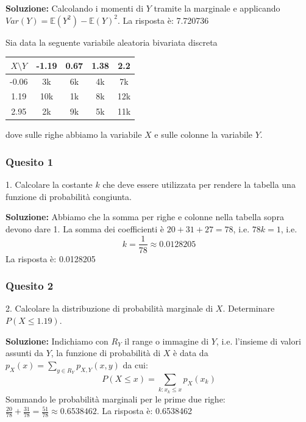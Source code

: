 \documentclass[12pt, a4paper]{article}
\begin{document}
\textbf{Soluzione:}
Calcolando i momenti di $Y$ tramite la marginale e applicando $Var(Y) = \mathbb{E}(Y^2) - \mathbb{E}(Y)^2$.
La risposta è: 7.720736


\vspace{0.5cm}
\begin{tcolorbox}[colback=lightergray!10, colframe=tocsec, title=\textbf{Esercizio 12}]
Sia data la seguente variabile aleatoria bivariata discreta 
\begin{center}
\begin{tabular}{c|cccc}
\toprule
$X \setminus Y$ & -1.19 & 0.67 & 1.38 & 2.2 \\
\midrule
-0.06 & 3k & 6k & 4k & 7k \\
1.19 & 10k & 1k & 8k & 12k \\
2.95 & 2k & 9k & 5k & 11k \\
\bottomrule
\end{tabular}
\end{center}
dove sulle righe abbiamo la variabile $X$ e sulle colonne la variabile $Y$.
\end{tcolorbox}

\subsubsection*{Quesito 1}
1. Calcolare la costante $k$ che deve essere utilizzata per rendere la tabella una funzione di probabilità congiunta.

\textbf{Soluzione:}
Abbiamo che la somma per righe e colonne nella tabella sopra devono dare 1. La somma dei coefficienti è $20 + 31 + 27 = 78$, i.e. $78k = 1$, i.e.
$$ k = \frac{1}{78} \approx 0.0128205 $$
La risposta è: 0.0128205

\subsubsection*{Quesito 2}
2. Calcolare la distribuzione di probabilità marginale di $X$. Determinare $P(X \leq 1.19)$.

\textbf{Soluzione:}
Indichiamo con $R_Y$ il range o immagine di $Y$, i.e. l’insieme di valori assunti da $Y$, la funzione di probabilità di $X$ è data da $p_X(x) = \sum_{y \in R_Y} p_{X,Y}(x,y)$ da cui:
$$ P(X \leq x) = \sum_{k:x_k \leq x} p_X(x_k) $$
Sommando le probabilità marginali per le prime due righe: $\frac{20}{78} + \frac{31}{78} = \frac{51}{78} \approx 0.6538462$.
La risposta è: 0.6538462
\end{document}
